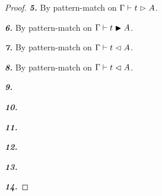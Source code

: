\begin{proof}
    \textbf{\textit{5.}} By pattern-match on $\Gamma \vdash t \vartriangleright A$.

    \textbf{\textit{6.}} By pattern-match on $\Gamma \vdash t \blacktriangleright A$.

    \textbf{\textit{7.}} By pattern-match on $\Gamma \vdash t \vartriangleleft A$.

    \textbf{\textit{8.}} By pattern-match on $\Gamma \vdash t \vartriangleleft A$.

    \textbf{\textit{9.}}

    \textbf{\textit{10.}}

    \textbf{\textit{11.}}

    \textbf{\textit{12.}}

    \textbf{\textit{13.}}

    \textbf{\textit{14.}}


\end{proof}




